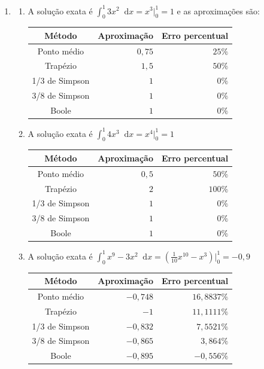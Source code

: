 \documentclass[12pt,a4paper]{article}
\newcommand*\diff{\mathop{}\!\mathrm{d}}
\begin{document}
\begin{enumerate}
\item
\begin{enumerate}
\item A solução exata é $\int_0^1 3x^2 \diff{x} = x^3 \Big|_0^1 = 1$ e as aproximações são:
\begin{center}
\begin{tabular}{crr}
\hline
Método         & Aproximação & Erro percentual \\ \hline
Ponto médio    & $0,75$ & $25\%$ \\
Trapézio       & $1,5$ & $50\%$ \\
1/3 de Simpson & $1$ & $0\%$ \\
3/8 de Simpson & $1$ & $0\%$ \\
Boole          & $1$ & $0\%$ \\
\hline
\end{tabular}
\end{center}
\item A solução exata é $\int_0^1 4x^3 \diff{x} = x^4 \Big|_0^1 = 1$
\begin{center}
\begin{tabular}{crr}
\hline
Método         & Aproximação & Erro percentual \\ \hline
Ponto médio    & $0,5$ & $50\%$ \\
Trapézio       & $2$ & $100\%$ \\
1/3 de Simpson & $1$ & $0\%$ \\
3/8 de Simpson & $1$ & $0\%$ \\
Boole          & $1$ & $0\%$ \\
\hline
\end{tabular}
\end{center}
\item A solução exata é $\int_0^1 x^9 - 3x^2 \diff{x}= \left(\frac{1}{10}x^{10} - x^3\right) \Big|_0^1 = -0,9$
\begin{center}
\begin{tabular}{crr}
\hline
Método         & Aproximação & Erro percentual \\ \hline
Ponto médio    & $-0,748$ &  $16,8837\%$  \\
Trapézio       & $-1$ & $11,1111\%$ \\
1/3 de Simpson & $-0,832$ & $7,5521\%$ \\
3/8 de Simpson & $-0,865$ & $3,864\%$ \\
Boole          & $-0,895$ & $-0,556\%$\\
\hline
\end{tabular}
\end{center}

\end{enumerate}
\end{enumerate}
\end{document}
